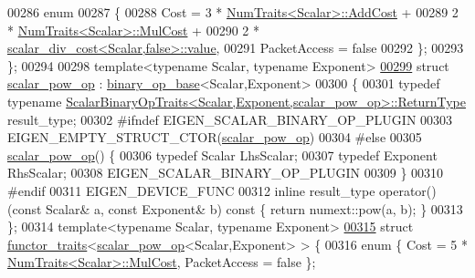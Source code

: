 \begin{DoxyCode}
00286   \textcolor{keyword}{enum}
00287   \{
00288     Cost = 3 * \hyperlink{group___core___module_struct_eigen_1_1_num_traits}{NumTraits<Scalar>::AddCost} +
00289            2 * \hyperlink{group___core___module_struct_eigen_1_1_num_traits}{NumTraits<Scalar>::MulCost} +
00290            2 * \hyperlink{struct_eigen_1_1internal_1_1scalar__div__cost}{scalar\_div\_cost<Scalar,false>::value},
00291     PacketAccess = \textcolor{keyword}{false}
00292   \};
00293 \};
00294 
00298 \textcolor{keyword}{template}<\textcolor{keyword}{typename} Scalar, \textcolor{keyword}{typename} Exponent>
\hyperlink{struct_eigen_1_1internal_1_1scalar__pow__op}{00299} \textcolor{keyword}{struct }\hyperlink{struct_eigen_1_1internal_1_1scalar__pow__op}{scalar\_pow\_op}  : \hyperlink{struct_eigen_1_1internal_1_1binary__op__base}{binary\_op\_base}<Scalar,Exponent>
00300 \{
00301   \textcolor{keyword}{typedef} \textcolor{keyword}{typename} 
      \hyperlink{group___core___module_struct_eigen_1_1_scalar_binary_op_traits}{ScalarBinaryOpTraits<Scalar,Exponent,scalar\_pow\_op>::ReturnType}
       result\_type;
00302 \textcolor{preprocessor}{#ifndef EIGEN\_SCALAR\_BINARY\_OP\_PLUGIN}
00303   EIGEN\_EMPTY\_STRUCT\_CTOR(\hyperlink{struct_eigen_1_1internal_1_1scalar__pow__op}{scalar\_pow\_op})
00304 \textcolor{preprocessor}{#else}
00305   \hyperlink{struct_eigen_1_1internal_1_1scalar__pow__op}{scalar\_pow\_op}() \{
00306     \textcolor{keyword}{typedef} Scalar LhsScalar;
00307     \textcolor{keyword}{typedef} Exponent RhsScalar;
00308     EIGEN\_SCALAR\_BINARY\_OP\_PLUGIN
00309   \}
00310 \textcolor{preprocessor}{#endif}
00311   EIGEN\_DEVICE\_FUNC
00312   \textcolor{keyword}{inline} result\_type operator() (\textcolor{keyword}{const} Scalar& a, \textcolor{keyword}{const} Exponent& b)\textcolor{keyword}{ const }\{ \textcolor{keywordflow}{return} numext::pow(a, b); \}
00313 \};
00314 \textcolor{keyword}{template}<\textcolor{keyword}{typename} Scalar, \textcolor{keyword}{typename} Exponent>
\hyperlink{struct_eigen_1_1internal_1_1functor__traits_3_01scalar__pow__op_3_01_scalar_00_01_exponent_01_4_01_4}{00315} \textcolor{keyword}{struct }\hyperlink{struct_eigen_1_1internal_1_1functor__traits}{functor\_traits}<\hyperlink{struct_eigen_1_1internal_1_1scalar__pow__op}{scalar\_pow\_op}<Scalar,Exponent> > \{
00316   \textcolor{keyword}{enum} \{ Cost = 5 * \hyperlink{group___core___module_struct_eigen_1_1_num_traits}{NumTraits<Scalar>::MulCost}, PacketAccess = \textcolor{keyword}{false} \};

\end{DoxyCode}

